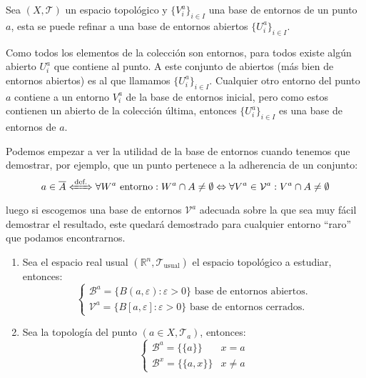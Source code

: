 \begin{prop}
Sea $(X,\mathcal{T})$ un espacio topológico y $\{V_i^a \}_{i\in I}$ una base de entornos de un punto $a$, esta se puede refinar a una base de entornos abiertos $\{U_i^a\}_{i\in I}$. 
\end{prop}
\begin{demo}    
Como todos los elementos de la colección son entornos, para todos existe algún abierto $U_i^a$ que contiene al punto. A este conjunto de abiertos (más bien de entornos abiertos) es al que llamamos $\{U_i^a\}_{i\in I}$. Cualquier otro entorno del punto $a$ contiene a un entorno $V_i^a$ de la base de entornos inicial, pero como estos contienen un abierto de la colección última, entonces $\{U_i^a\}_{i\in I}$ es una base de entornos de  $a$.
\end{demo}

\begin{obs}    
Podemos empezar a ver la utilidad de la base de entornos cuando tenemos que demostrar, por ejemplo, que un punto pertenece a la adherencia de un conjunto:
$$
a \in \overline{A} \xLeftrightarrow{\text{def.}} \forall W^a \text{ entorno}: W^a \cap A \neq \emptyset \Leftrightarrow \forall V^a \in \mathcal{V}^a: V^a\cap A \neq \emptyset
$$
luego si escogemos una base de entornos $\mathcal{V}^a$ adecuada sobre la que sea muy fácil demostrar el resultado, este quedará demostrado para cualquier entorno ``raro'' que podamos encontrarnos.
\end{obs}

\begin{ej}
\begin{enumerate}
    \item Sea el espacio real usual $(\mathbb{R}^n, \mathcal{T}_{\text{usual}})$ el espacio topológico a estudiar, entonces:
    $$
    \begin{cases}
    \mathcal{B}^a = \{B\left( a, \varepsilon \right): \varepsilon > 0\} \text{ base de entornos abiertos.}  \\
    \mathcal{V}^a = \{B\left[ a, \varepsilon \right]: \varepsilon > 0\} \text{ base de entornos cerrados.} 
    \end{cases} 
    $$
    \item Sea la topología del punto $(a \in X, \mathcal{T}_a)$, entonces:
	$$
	\begin{cases}
	\mathcal{B}^a = \{\{a\}\} & x = a\\
	\mathcal{B}^x = \{\{a, x\}\} & x \neq a
	\end{cases}
	$$
\end{enumerate}
\end{ej}

